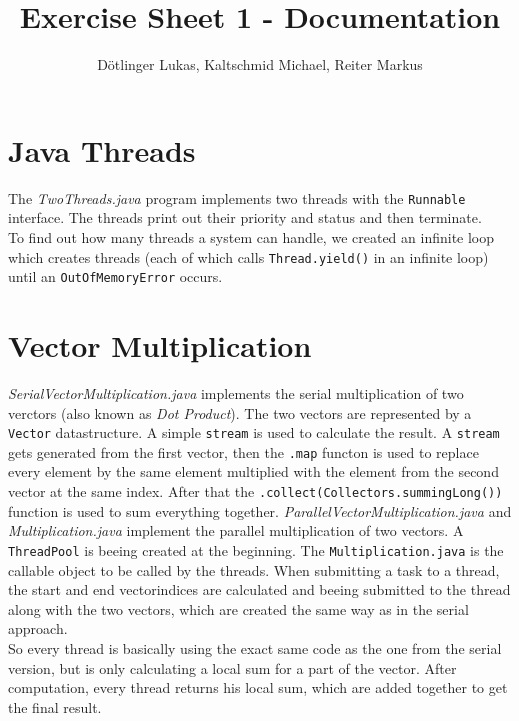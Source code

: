 \documentclass{article}
\begin{document}
	\title{Exercise Sheet 1 - Documentation}
	\date{}
	\author{Dötlinger Lukas, Kaltschmid Michael, Reiter Markus}

	\maketitle


	\section{Java Threads}
	The \textit{TwoThreads.java} program implements two threads with the \texttt{Runnable} interface. The threads print out their priority and status and then terminate.\\
    To find out how many threads a system can handle, we created an infinite loop which creates threads (each of which calls \texttt{Thread.yield()} in an infinite loop) until an \texttt{OutOfMemoryError} occurs.

	\section{Vector Multiplication}
		\textit{SerialVectorMultiplication.java} implements the serial multiplication of two verctors (also known as \textit{Dot Product}). The two vectors are represented by a \texttt{Vector} datastructure. A simple \texttt{stream} is used to calculate the result. A \texttt{stream} gets generated from the first vector, then the \texttt{.map} functon is used to replace every element by the same element multiplied with the element from the second vector at the same index. After that the \texttt{.collect(Collectors.summingLong())} function is used to sum everything together.\bigbreak
		\textit{ParallelVectorMultiplication.java} and \textit{Multiplication.java} implement the parallel multiplication of two vectors. A \texttt{ThreadPool} is beeing created at the beginning. The \texttt{Multiplication.java} is the callable object to be called by the threads. When submitting a task to a thread, the start and end vectorindices are calculated and beeing submitted to the thread along with the two vectors, which are created the same way as in the serial approach.\\ 
		So every thread is basically using the exact same code as the one from the serial version, but is only calculating a local sum for a part of the vector.
		After computation, every thread returns his local sum, which are added together to get the final result.
\end{document}
